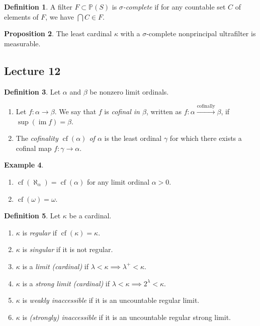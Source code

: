 \documentclass[10pt,letterpaper,cm]{nupset}
\theoremstyle{definition}
\newtheorem{definition}{Definition}[subsection]
\newtheorem{exmp}[definition]{Example}
\theoremstyle{theorem}
\newtheorem{prop}[definition]{Proposition}
\theoremstyle{remark}
\renewcommand{\P}{\mathbb P}
\newcommand{\1}{\mathbf{1}}
\newcommand{\0}{\vec 0}
\DeclareMathOperator{\im}{im}
\DeclareMathOperator{\cf}{cf}
\begin{document}
\begin{definition}
A filter $F\subset \P(S)$ is \textit{$\sigma$-complete} if for any countable set $C$ of elements of $F$, we have $\bigcap{C} \in F$.
\end{definition}

\begin{prop}
The least cardinal $\kappa$  with a $\sigma$-complete nonprincipal ultrafilter is measurable. 
\end{prop}

\subsection{Lecture 12}

\begin{definition}
Let $\alpha$ and $\beta$ be nonzero limit ordinals. 
\begin{enumerate}
\item Let $f: \alpha \to \beta$. We say that $f$ is \textit{cofinal in $\beta$}, written as \textit{$f : \alpha \xrightarrow{\text{cofinally}} \beta$}, if $\sup(\im{f}) = \beta$. 
\item The \textit{cofinality $\cf(\alpha)$  of $\alpha$} is the least ordinal $\gamma$ for which there exists a cofinal map $f: \gamma \to \alpha$.
\end{enumerate}
\end{definition}

\begin{exmp} $ $
\begin{enumerate}
\item $\cf(\aleph_{\alpha}) = \cf(\alpha)$ for any limit ordinal $\alpha >0$.
\item $\cf(\omega) =  \omega$.
\end{enumerate}
\end{exmp}


\begin{definition} Let $\kappa$ be a cardinal.
\begin{enumerate}
\item $\kappa$ is \textit{regular} if $\cf(\kappa) = \kappa$.
\item $\kappa$ is \textit{singular} if it is not regular.
\item $\kappa$ is a \textit{limit (cardinal)} if $\lambda <\kappa \implies \lambda^+ < \kappa$.
\item $\kappa$ is a \textit{strong limit (cardinal)} if $\lambda < \kappa \implies 2^{\lambda} < \kappa$.
\item $\kappa$ is \textit{weakly inaccessible}  if it is an uncountable  regular limit.
\item $\kappa$ is \textit{(strongly) inaccessible} if it is an uncountable regular strong limit.
\end{enumerate} 
\end{definition}
\end{document}
